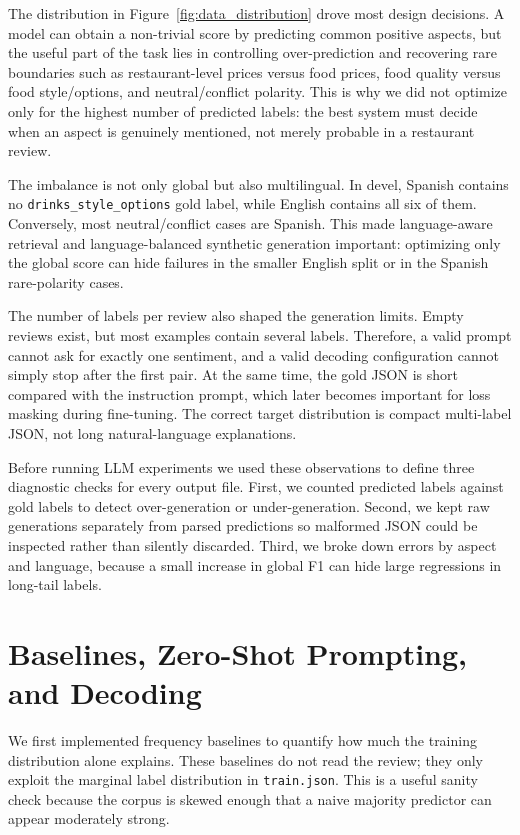 \documentclass[11pt,a4paper]{article}
\newcommand{\code}[1]{\texttt{#1}}
\begin{document}
The distribution in Figure~\ref{fig:data_distribution} drove most design decisions. A model can obtain a non-trivial score by predicting common positive aspects, but the useful part of the task lies in controlling over-prediction and recovering rare boundaries such as restaurant-level prices versus food prices, food quality versus food style/options, and neutral/conflict polarity. This is why we did not optimize only for the highest number of predicted labels: the best system must decide when an aspect is genuinely mentioned, not merely probable in a restaurant review.

The imbalance is not only global but also multilingual. In devel, Spanish contains no \code{drinks\_style\_options} gold label, while English contains all six of them. Conversely, most neutral/conflict cases are Spanish. This made language-aware retrieval and language-balanced synthetic generation important: optimizing only the global score can hide failures in the smaller English split or in the Spanish rare-polarity cases.

The number of labels per review also shaped the generation limits. Empty reviews exist, but most examples contain several labels. Therefore, a valid prompt cannot ask for exactly one sentiment, and a valid decoding configuration cannot simply stop after the first pair. At the same time, the gold JSON is short compared with the instruction prompt, which later becomes important for loss masking during fine-tuning. The correct target distribution is compact multi-label JSON, not long natural-language explanations.

Before running LLM experiments we used these observations to define three diagnostic checks for every output file. First, we counted predicted labels against gold labels to detect over-generation or under-generation. Second, we kept raw generations separately from parsed predictions so malformed JSON could be inspected rather than silently discarded. Third, we broke down errors by aspect and language, because a small increase in global F1 can hide large regressions in long-tail labels.

\section{Baselines, Zero-Shot Prompting, and Decoding}

We first implemented frequency baselines to quantify how much the training distribution alone explains. These baselines do not read the review; they only exploit the marginal label distribution in \code{train.json}. This is a useful sanity check because the corpus is skewed enough that a naive majority predictor can appear moderately strong.
\end{document}
